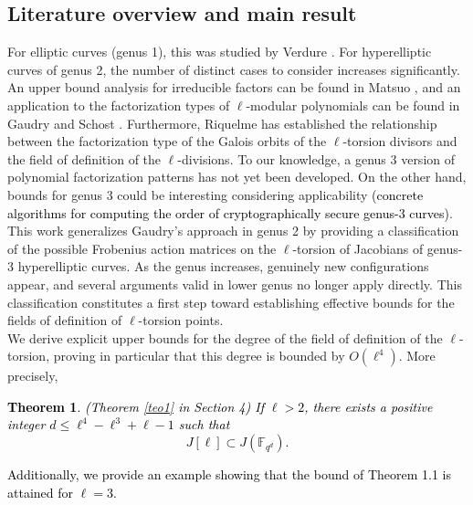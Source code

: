 \documentclass[11pt,a4paper]{article}
\theoremstyle{plain}
\newtheorem{theorem}{Theorem}[section]
\theoremstyle{definition}
\theoremstyle{remark}
\newcommand{\verde}[1]{\textcolor{black}{#1}}
\newcommand{\azul}[1]{\textcolor{black}{#1}}
\begin{document}
\subsection{Literature overview and main result}
For elliptic curves (genus 1), this was studied by Verdure \cite{verdure}. 
For hyperelliptic curves of genus 2, the number of distinct cases to consider increases significantly. An upper bound analysis for irreducible factors can be found in Matsuo \cite{IM10}, and an application to the factorization types of $\ell$-modular polynomials can be found in Gaudry and Schost \cite{GS05}. Furthermore, Riquelme \cite{riquelme2016} has established the relationship between the factorization type of the Galois orbits of the $\ell$-torsion divisors and the field of definition of the $\ell$-divisions.
To our knowledge, a genus 3 version of polynomial factorization patterns has not yet been developed. On the other hand, bounds for genus 3 could be interesting considering applicability \azul{(concrete algorithms for computing the order of cryptographically secure genus-3 curves)}.
 This work generalizes Gaudry's approach in genus 2 by providing a classification of the possible Frobenius action matrices on the $\ell$-torsion of Jacobians of genus-3 hyperelliptic curves. As the genus increases, genuinely new configurations appear, and several arguments valid in lower genus no longer apply directly. This classification constitutes a first step toward establishing effective bounds for the fields of definition of $\ell$-torsion points.\\
We derive explicit upper bounds for the degree of the field of definition of the $\ell$-torsion, proving in particular that this degree is bounded by $O(\ell^4)$. More precisely, 
\verde{\begin{theorem}{(Theorem \ref{teo1} in Section 4)}
 If $ \ell > 2$, there exists a positive integer \(d \leq \ell^4 - \ell^3 + \ell - 1\) such that
\[
J[\ell] \subset J(\mathbb{F}_{q^d}).
\] 
\end{theorem}}
\verde{Additionally, we provide an example  showing that the bound of Theorem 1.1 is attained for $\ell=3$.} 
\end{document}
